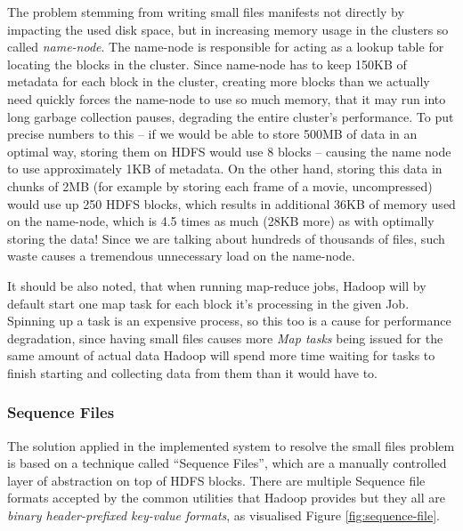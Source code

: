 The problem stemming from writing small files manifests not directly by impacting the used disk space, but in increasing memory usage in the clusters so called \textit{name-node}. The name-node is responsible for acting as a lookup table for locating the blocks in the cluster. Since name-node has to keep 150KB of metadata for each block in the cluster, creating more blocks than we actually need quickly forces the name-node to use so much memory, that it may run into long garbage collection pauses, degrading the entire cluster's performance. To put precise numbers to this -- if we would be able to store 500MB of data in an optimal way, storing them on HDFS would use 8 blocks -- causing the name node to use approximately 1KB of metadata. On the other hand, storing this data in chunks of 2MB (for example by storing each frame of a movie, uncompressed) would use up 250 HDFS blocks, which results in additional 36KB of memory used on the name-node, which is 4.5 times as much (28KB more) as with optimally storing the data! Since we are talking about hundreds of thousands of files, such waste causes a tremendous unnecessary load on the name-node.

It should be also noted, that when running map-reduce jobs, Hadoop will by default start one map task for each block it's processing in the given Job. Spinning up a task is an expensive process, so this too is a cause for performance degradation, since having small files causes more \textit{Map tasks} being issued for the same amount of actual data Hadoop will spend more time waiting for tasks to finish starting and collecting data from them than it would have to.

\subsubsection{Sequence Files}
\label{sequence-file}
The solution applied in the implemented system to resolve the small files problem is based on a technique called ``Sequence Files'', which are a manually controlled layer of abstraction on top of HDFS blocks. There are multiple Sequence file formats accepted by the common utilities that Hadoop provides \cite{hadoop-seq-files} but they all are \textit{binary header-prefixed key-value formats}, as visualised Figure \ref{fig:sequence-file}.


